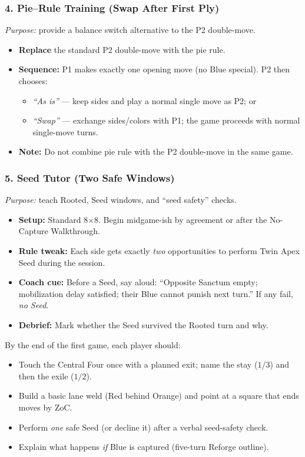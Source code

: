 \documentclass[11pt]{article}
\begin{document}
\subsubsection*{4. Pie–Rule Training (Swap After First Ply)}
\textit{Purpose:} provide a balance switch alternative to the P2 double-move.
\begin{itemize}[leftmargin=1.3em]
  \item \textbf{Replace} the standard P2 double-move with the pie rule.
  \item \textbf{Sequence:} P1 makes exactly one opening move (no Blue special). P2 then chooses:
    \begin{itemize}
      \item \emph{“As is”} — keep sides and play a normal single move as P2; or
      \item \emph{“Swap”} — exchange sides/colors with P1; the game proceeds with normal single-move turns.
    \end{itemize}
  \item \textbf{Note:} Do not combine pie rule with the P2 double-move in the same game.
\end{itemize}

\subsubsection*{5. Seed Tutor (Two Safe Windows)}
\textit{Purpose:} teach Rooted, Seed windows, and “seed safety” checks.
\begin{itemize}[leftmargin=1.3em]
  \item \textbf{Setup:} Standard 8×8. Begin midgame-ish by agreement or after the No-Capture Walkthrough.
  \item \textbf{Rule tweak:} Each side gets exactly \emph{two} opportunities to perform Twin Apex Seed during the session.
  \item \textbf{Coach cue:} Before a Seed, say aloud: “Opposite Sanctum empty; mobilization delay satisfied; their Blue cannot punish next turn.” If any fail, \emph{no Seed}.
  \item \textbf{Debrief:} Mark whether the Seed survived the Rooted turn and why.
\end{itemize}

\begin{rulevariant}[title={First-Session Goals (Say These Out Loud)}]
By the end of the first game, each player should:
\begin{itemize}\itemsep0.2em
  \item Touch the Central Four once with a planned exit; name the stay (\(1/3\)) and then the exile (\(1/2\)).
  \item Build a basic lane weld (Red behind Orange) and point at a square that ends moves by ZoC.
  \item Perform \emph{one} safe Seed (or decline it) after a verbal seed-safety check.
  \item Explain what happens \emph{if} Blue is captured (five-turn Reforge outline).
\end{itemize}
\end{rulevariant}
\end{document}
